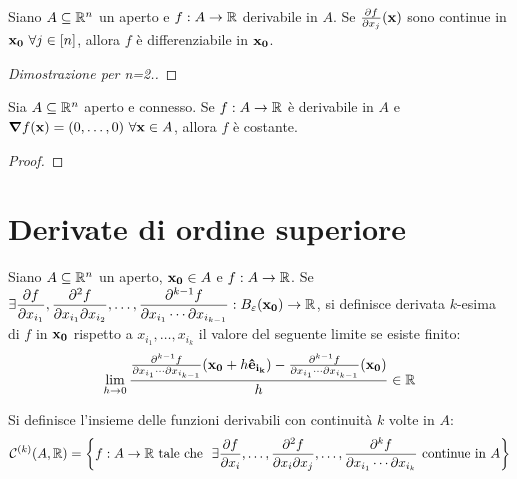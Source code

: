 \begin{theorem}
    Siano $A \subseteq \mathbb{R}^n$ un aperto e $f: A \to \mathbb{R}$ derivabile in $A$. Se $\frac{\partial f}{\partial x_j} (\vb{x})$ sono continue in $\vb{x_0} \ \forall j \in [n]$, allora $f$ è differenziabile in $\vb{x_0}$.
\end{theorem}

\begin{proof}[Dimostrazione per n=2.]
\end{proof}

\begin{theorem}
    Sia $A \subseteq \mathbb{R}^n$ aperto e connesso. Se $f: A \to \mathbb{R}$ è derivabile in $A$ e $\grad f (\vb{x})=(0,\dots,0) \ \forall \vb{x} \in A$, allora $f$ è costante.
\end{theorem}

\begin{proof}
\end{proof}

\section{Derivate di ordine superiore}

\begin{definition}
    Siano $A \subseteq \mathbb{R}^n$ un aperto, $\vb{x_0} \in A$ e $f:A \to \mathbb{R}$. Se $\displaystyle \exists \frac{\partial f}{\partial x_{i_1}}, \frac{\partial^2 f}{\partial x_{i_1} \partial x_{i_2}},\dots,\frac{\partial ^{k-1}f}{\partial x_{i_1} \cdots \partial x_{i_{k-1}}} : B_\varepsilon(\vb{x_0}) \to \mathbb{R}$, si definisce derivata $k$-esima di $f$ in $\vb{x_0}$ rispetto a $x_{i_1},\dots,x_{i_{k}}$ il valore del seguente limite se esiste finito:
    $$
        \lim_{h\to 0}\frac{\frac{\partial^{k-1}f}{\partial x_{i_1}\cdots \partial x_{i_{k-1}}}(\vb{x_0}+ h \vb{\hat{e}_{i_k}})- \frac{\partial^{k-1}f}{\partial x_{i_1}\cdots \partial x_{i_{k-1}}}(\vb{x_0})}{h} \in \mathbb{R}
    $$
\end{definition}

\begin{definition}
    [Insieme $\C{k}(A, \R)$]
    Si definisce l'insieme delle funzioni derivabili con continuità $k$ volte in $A$:
    $$
        \displaystyle \mathcal{C}^{(k)}(A,\mathbb{R}) = \left\{ f: A \to \mathbb{R} \text{ tale che } \ \exists \frac{\partial f}{\partial x_i},\dots,\frac{\partial ^2 f}{\partial x_i \partial x_j}, \dots, \frac{\partial ^k f}{\partial x_{i_1}\cdots\partial x_{i_k}} \text{ continue in } A \right\}
    $$
\end{definition}

